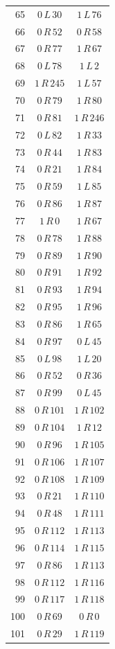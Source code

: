 \begin{longtable}{rcc}
65 & $0\,L\,30$ & $1\,L\,76$\\
66 & $0\,R\,52$ & $0\,R\,58$\\
67 & $0\,R\,77$ & $1\,R\,67$\\
68 & $0\,L\,78$ & $1\,L\,2$\\
69 & $1\,R\,245$ & $1\,L\,57$\\
70 & $0\,R\,79$ & $1\,R\,80$\\
71 & $0\,R\,81$ & $1\,R\,246$\\
72 & $0\,L\,82$ & $1\,R\,33$\\
73 & $0\,R\,44$ & $1\,R\,83$\\
74 & $0\,R\,21$ & $1\,R\,84$\\
75 & $0\,R\,59$ & $1\,L\,85$\\
76 & $0\,R\,86$ & $1\,R\,87$\\
77 & $1\,R\,0$ & $1\,R\,67$\\
78 & $0\,R\,78$ & $1\,R\,88$\\
79 & $0\,R\,89$ & $1\,R\,90$\\
80 & $0\,R\,91$ & $1\,R\,92$\\
81 & $0\,R\,93$ & $1\,R\,94$\\
82 & $0\,R\,95$ & $1\,R\,96$\\
83 & $0\,R\,86$ & $1\,R\,65$\\
84 & $0\,R\,97$ & $0\,L\,45$\\
85 & $0\,L\,98$ & $1\,L\,20$\\
86 & $0\,R\,52$ & $0\,R\,36$\\
87 & $0\,R\,99$ & $0\,L\,45$\\
88 & $0\,R\,101$ & $1\,R\,102$\\
89 & $0\,R\,104$ & $1\,R\,12$\\
90 & $0\,R\,96$ & $1\,R\,105$\\
91 & $0\,R\,106$ & $1\,R\,107$\\
92 & $0\,R\,108$ & $1\,R\,109$\\
93 & $0\,R\,21$ & $1\,R\,110$\\
94 & $0\,R\,48$ & $1\,R\,111$\\
95 & $0\,R\,112$ & $1\,R\,113$\\
96 & $0\,R\,114$ & $1\,R\,115$\\
97 & $0\,R\,86$ & $1\,R\,113$\\
98 & $0\,R\,112$ & $1\,R\,116$\\
99 & $0\,R\,117$ & $1\,R\,118$\\
100 & $0\,R\,69$ & $0\,R\,0$\\
101 & $0\,R\,29$ & $1\,R\,119$\\

\end{longtable}
